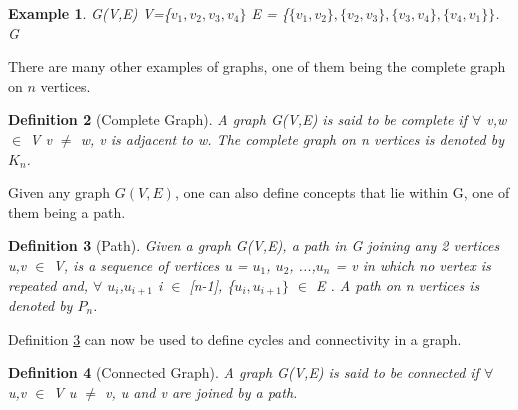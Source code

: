 \documentclass{article}
\newtheorem{definition}{Definition}[subsection]
\newtheorem{example}[definition]{Example}
\begin{document}
\begin{example}
\label{Example 1}
{} G(V,E) {}  V=\{$v_1, v_2, v_3, v_4\}$ {} E = \{$\{v_1, v_2\}, \{v_2,v_3\}, \{v_3,v_4\}, \{v_4,v_1\}\}$.\\{} G {}\\

\end{example}
There are many other examples of graphs, one of them being the complete graph on $\mathit{n}$ vertices.
\begin{definition}[Complete Graph]
\label{Complete Graph}
A graph G(V,E) is said to be complete if $\forall$ v,w $\in$ V v $\neq$ w, v is adjacent to w. The complete graph on n vertices is denoted by $K_n$. 
\end{definition}
Given any graph $\mathit{G(V,E)}$, one can also define concepts that lie within G, one of them being a path.
\begin{definition}[Path]
\label{Path}
Given a graph G(V,E), a path in G joining any 2 vertices u,v $\in$ V, is a sequence of vertices u = $u_1$, $u_2$, ...,$u_n$ = v in which no vertex is repeated and, $\forall$ $u_i$,$u_{i+1}$ i $\in$ [n-1], \{$u_i,u_{i+1}\}$ $\in$ E {}. A path on n vertices is denoted by $P_n$.
\end{definition}
Definition \ref{Path} can now be used to define cycles and connectivity in a graph.
\begin{definition}[Connected Graph]
\label{connectedgraph}
A graph G(V,E) is said to be connected if $\forall$ u,v $\in$ V u $\neq$ v, u and v are joined by a path. 
\end{definition}
\end{document}
